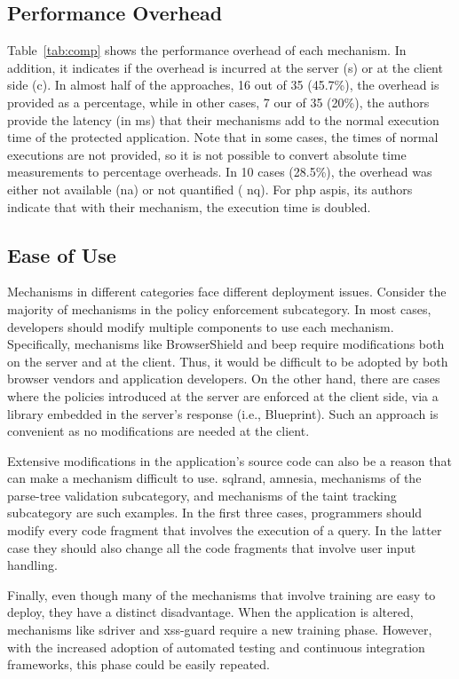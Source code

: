 \documentclass[conference]{IEEEtran}
\begin{document}
\subsection{Performance Overhead}

Table~\ref{tab:comp} shows the performance overhead of each mechanism.
In addition, it indicates if the overhead is incurred at the
server ({\sc s}) or at the client side ({\sc c}). In almost half of
the approaches, 16 out of 35 (45.7\%), the overhead is provided as a
percentage, while in other cases, 7 our of 35 (20\%), the authors
provide the latency (in ms) that their mechanisms add to the
normal execution time of the protected application. Note that in some
cases, the times of normal executions are not provided,
so it is not possible to convert absolute
time measurements to percentage overheads. In 10 cases (28.5\%), the
overhead was either not available ({\sc na}) or not quantified ({\sc
  nq}). For {\sc php aspis}, its authors indicate that with
their mechanism, the execution time is doubled.

\subsection{Ease of Use}
\label{sec:deploy2}

Mechanisms in different categories face different deployment issues.
Consider the majority of mechanisms in the policy enforcement
subcategory. In most cases, developers should modify multiple
components to use each mechanism. Specifically, mechanisms like
BrowserShield and {\sc beep} require modifications both on the server
and at the client. Thus, it would be difficult to be
adopted by both browser vendors and application developers. On the
other hand, there are cases where the policies introduced at the
server are enforced at the client side, via a library embedded in the
server's response (i.e., Blueprint). Such an approach is convenient
as no modifications are needed at the client.

Extensive modifications in the application's source
code can also be a reason that can make a mechanism
difficult to use. {\sc sql}rand, {\sc amnesia},
mechanisms of the parse-tree validation
subcategory, and mechanisms of the taint
tracking subcategory are such examples.
In the first three cases, programmers should modify every
code fragment that involves the execution of a query.
In the latter case they should also change
all the code fragments that involve user input handling. 

Finally, even though many of the mechanisms that involve
training are easy to deploy, they have a distinct disadvantage.
When the application is altered, mechanisms like {\sc sd}river
and {\sc xss-guard} require a new training phase.
However, with the increased adoption of automated testing
and continuous integration frameworks, this phase could be
easily repeated.
\end{document}
